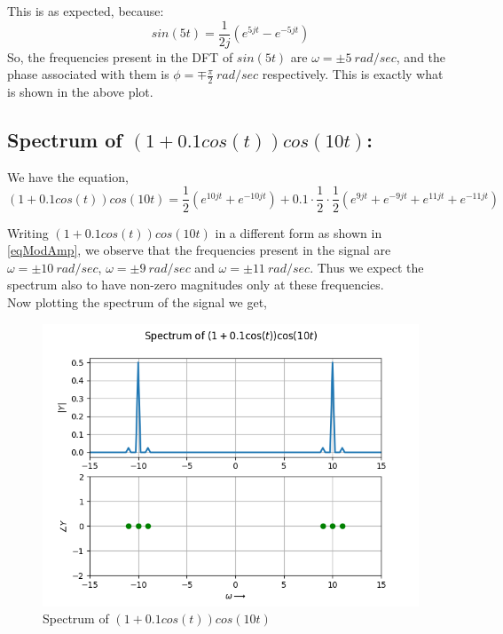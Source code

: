 \documentclass[11pt, a4paper]{article}
\begin{document}
This is as expected, because:
\begin{equation}
sin(5t) = \frac{1}{2j}(e^{5jt}-e^{-5jt})
\end{equation}
So, the frequencies present in the DFT of $sin(5t)$ are $\omega = \pm5\ rad/sec$, and the phase associated with them is $\phi = \mp \frac{\pi}{2}\ rad/sec$ respectively. This is exactly what is shown in the above plot.

\subsection{Spectrum of $(1+0.1cos(t))cos(10t)$:}
We have the equation,
\begin{equation}
    (1+0.1cos(t))cos(10t) = \frac{1}{2}(e^{10jt}+e^{-10jt}) + 0.1\cdot\frac{1}{2}\cdot\frac{1}{2}(e^{9jt} + e^{-9jt} + e^{11jt} + e^{-11jt})
\label{eqModAmp}
\end{equation}
    
Writing $(1+0.1cos(t))cos(10t)$ in a different form as shown in \eqref{eqModAmp}, we observe that the frequencies present in the signal are $\omega = \pm 10\ rad/sec$, $\omega = \pm 9\ rad/sec$ and $\omega = \pm 11\ rad/sec$. Thus we expect the spectrum also to have non-zero magnitudes only at these frequencies.\\


Now plotting the spectrum of the signal we get,
\begin{figure}[H]
\centering
\includegraphics[scale=0.6]{Figure_2.png}
\caption{Spectrum of $(1+0.1cos(t))cos(10t)$}
\label{fig:fig_3}
\end{figure}
\end{document}
